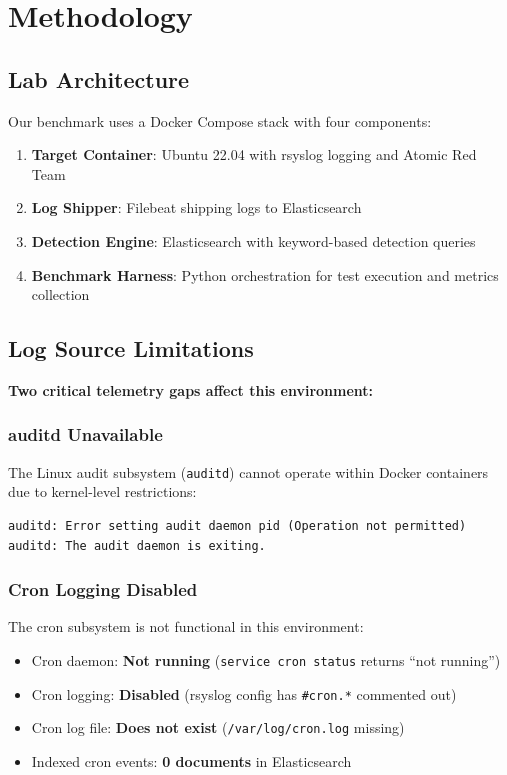 \documentclass[11pt,a4paper]{article}
\begin{document}
\section{Methodology}

\subsection{Lab Architecture}

Our benchmark uses a Docker Compose stack with four components:

\begin{enumerate}
    \item \textbf{Target Container}: Ubuntu 22.04 with rsyslog logging and Atomic Red Team
    \item \textbf{Log Shipper}: Filebeat shipping logs to Elasticsearch
    \item \textbf{Detection Engine}: Elasticsearch with keyword-based detection queries
    \item \textbf{Benchmark Harness}: Python orchestration for test execution and metrics collection
\end{enumerate}

\subsection{Log Source Limitations}

\textbf{Two critical telemetry gaps affect this environment:}

\subsubsection{auditd Unavailable}

The Linux audit subsystem (\texttt{auditd}) cannot operate within Docker containers due to kernel-level restrictions:

\begin{verbatim}
auditd: Error setting audit daemon pid (Operation not permitted)
auditd: The audit daemon is exiting.
\end{verbatim}

\subsubsection{Cron Logging Disabled}

The cron subsystem is not functional in this environment:
\begin{itemize}
    \item Cron daemon: \textbf{Not running} (\texttt{service cron status} returns ``not running'')
    \item Cron logging: \textbf{Disabled} (rsyslog config has \texttt{\#cron.*} commented out)
    \item Cron log file: \textbf{Does not exist} (\texttt{/var/log/cron.log} missing)
    \item Indexed cron events: \textbf{0 documents} in Elasticsearch
\end{itemize}
\end{document}
